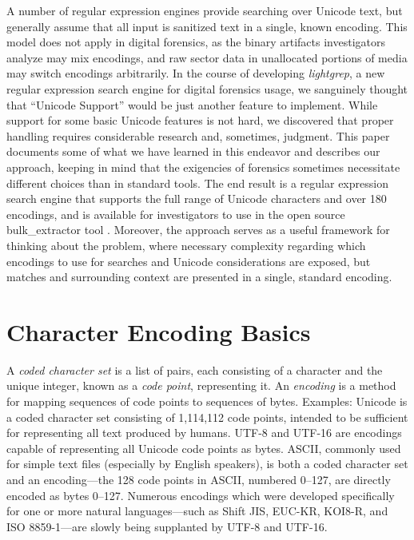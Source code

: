 \documentclass[5p,final,number,sort&compress]{elsarticle}
\begin{document}
A number of regular expression engines provide searching over Unicode text, but generally assume that all input is sanitized text in a single, known encoding. This model does not apply in digital forensics, as the binary artifacts investigators analyze may mix encodings, and raw sector data in unallocated portions of media may switch encodings arbitrarily. In the course of developing \emph{lightgrep}, a new regular expression search engine for digital forensics usage, we sanguinely thought that ``Unicode Support'' would be just another feature to implement. While support for some basic Unicode features is not hard, we discovered that proper handling requires considerable research and, sometimes, judgment. This paper documents some of what we have learned in this endeavor and describes our approach, keeping in mind that the exigencies of forensics sometimes necessitate different choices than in standard tools. The end result is a regular expression search engine that supports the full range of Unicode characters and over 180 encodings, and is available for investigators to use in the open source bulk\_extractor tool \citep{BulkExtractor}. Moreover, the approach serves as a useful framework for thinking about the problem, where necessary complexity regarding which encodings to use for searches and Unicode considerations are exposed, but matches and surrounding context are presented in a single, standard encoding.

\section{Character Encoding Basics}

A \emph{coded character set} is a list of pairs, each consisting of a character and the unique integer, known as a \emph{code point}, representing it.  An \emph{encoding} is a method for mapping sequences of code points to sequences of bytes. Examples: Unicode is a coded character set consisting of 1,114,112 code points, intended to be sufficient for representing all text produced by humans. UTF-8 and UTF-16 are encodings capable of representing all Unicode code points as bytes. ASCII, commonly used for simple text files (especially by English speakers), is both a coded character set and an encoding---the 128 code points in ASCII, numbered 0--127, are directly encoded as bytes 0--127. Numerous encodings which were developed specifically for one or more natural languages---such as Shift JIS, EUC-KR, KOI8-R, and ISO 8859-1---are slowly being supplanted by UTF-8 and UTF-16.
\end{document}
